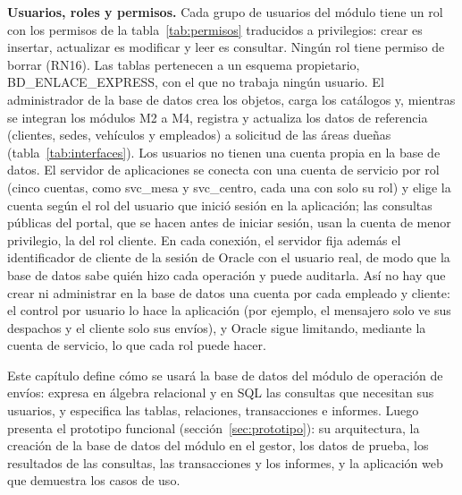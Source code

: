 \textbf{Usuarios, roles y permisos.} Cada grupo de usuarios del módulo
tiene un rol con los permisos de la tabla~\ref{tab:permisos} traducidos a
privilegios: crear es insertar, actualizar es modificar y leer es
consultar. Ningún rol tiene permiso de borrar (RN16). Las tablas
pertenecen a un esquema propietario, BD\_ENLACE\_EXPRESS, con el que no
trabaja ningún usuario. El administrador de la base de datos crea los objetos,
carga los catálogos y, mientras se integran los módulos M2 a M4,
registra y actualiza los datos de referencia (clientes, sedes,
vehículos y empleados) a solicitud de las áreas dueñas
(tabla~\ref{tab:interfaces}). Los usuarios no tienen una cuenta propia
en la base de datos. El servidor de aplicaciones se conecta con una
cuenta de servicio por rol (cinco cuentas, como svc\_mesa y svc\_centro,
cada una con solo su rol) y elige la cuenta según el rol del usuario que
inició sesión en la aplicación; las consultas públicas del portal, que se
hacen antes de iniciar sesión, usan la cuenta de menor privilegio, la del
rol cliente. En cada conexión, el servidor fija además el identificador
de cliente de la sesión de Oracle con el usuario real, de modo que la
base de datos sabe quién hizo cada operación y puede auditarla. Así no
hay que crear ni administrar en la base de datos una cuenta por cada
empleado y cliente: el control por usuario lo hace la aplicación (por
ejemplo, el mensajero solo ve sus despachos y el cliente solo sus
envíos), y Oracle sigue limitando, mediante la cuenta de servicio, lo que
cada rol puede hacer.




Este capítulo define cómo se usará la base de datos del módulo de
operación de envíos: expresa en álgebra relacional y en SQL las
consultas que necesitan sus usuarios, y especifica las tablas,
relaciones, transacciones e informes. Luego presenta el prototipo
funcional (sección~\ref{sec:prototipo}): su arquitectura, la creación de
la base de datos del módulo en el gestor, los datos de prueba, los
resultados de las consultas, las transacciones y los informes, y la
aplicación web que demuestra los casos de uso.


